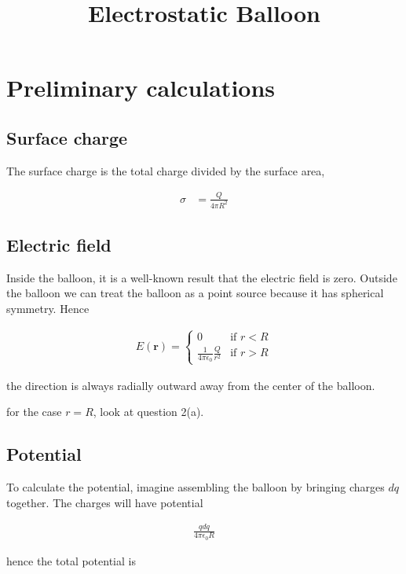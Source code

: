 \documentclass{article}
\title{Electrostatic Balloon}
\date{}
\newcommand{\mb}{\mathbf}
\begin{document}
\maketitle

\section{Preliminary calculations}

\subsection{Surface charge}

The surface charge is the total charge divided by the surface area,

\begin{align*}
\sigma &= \frac{Q}{4\pi R^2}
\end{align*}

\subsection{Electric field}

Inside the balloon, it is a well-known result that the electric field is zero. Outside the balloon we can treat the balloon as a point source because it has spherical symmetry. Hence

\begin{align*}
E(\mb r) = \begin{cases} 
0 &\mbox{if } r < R \\
\frac{1}{4\pi\epsilon_0} \frac{Q}{r^2} & \mbox{if } r > R \end{cases}
\end{align*}

the direction is always radially outward away from the center of the balloon.

for the case $r = R$, look at question 2(a).

\subsection{Potential}

To calculate the potential, imagine assembling the balloon by bringing charges $dq$ together. The charges will have potential

\begin{align*}
\frac{q dq}{4\pi\epsilon_0R}
\end{align*}

hence the total potential is
\end{document}
